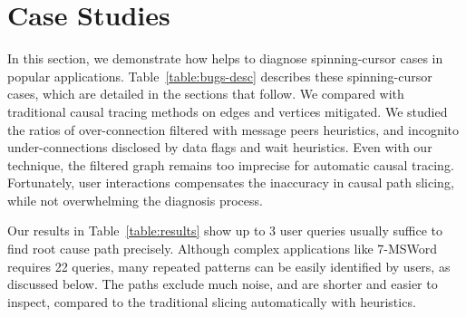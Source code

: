 \section{Case Studies}\label{sec:casestudy}

In this section, we demonstrate how \xxx helps to diagnose \nbug spinning-cursor
cases in \napps popular applications. Table~\ref{table:bugs-desc} describes
these spinning-cursor cases, which are detailed in the sections that follow. We
compared \xxx with traditional causal tracing methods on edges and vertices
\xxx mitigated. We studied the ratios of over-connection filtered with message
peers heuristics, and incognito under-connections disclosed by data flags and
wait heuristics. Even with our technique, the filtered graph remains too imprecise
for automatic causal tracing. Fortunately, user interactions compensates
the inaccuracy in causal path slicing, while not overwhelming the diagnosis
process.

Our results in Table~\ref{table:results} show up to 3 user queries usually
suffice to find root cause path precisely. Although complex applications like
7-MSWord requires 22 queries, many repeated patterns can be easily identified
by users, as discussed below. The paths exclude much noise, and are shorter
and easier to inspect, compared to the traditional slicing automatically with
heuristics.






